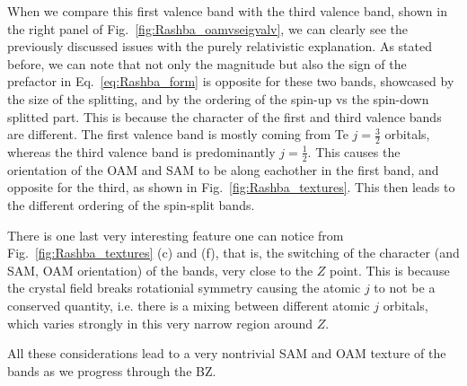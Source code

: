 When we compare this first valence band with the third valence band, shown in the right panel of Fig.~\ref{fig:Rashba_oamvseigvalv}, we can clearly see the previously discussed issues with the purely relativistic explanation. As stated before, we can note that not only the magnitude but also the sign of the prefactor in Eq.~\ref{eq:Rashba_form} is opposite for these two bands, showcased by the size of the splitting, and by the ordering of the spin-up vs the spin-down splitted part. This is because the character of the first and third valence bands are different. The first valence band is mostly coming from Te $j=\frac{3}{2}$ orbitals, whereas the third valence band is predominantly $j=\frac{1}{2}$. This causes the orientation of the OAM and SAM to be along eachother in the first band, and opposite for the third, as shown in Fig.~\ref{fig:Rashba_textures}. This then leads to the different ordering of the spin-split bands.

There is one last very interesting feature one can notice from Fig.~\ref{fig:Rashba_textures} (c) and (f), that is, the switching of the character (and SAM, OAM orientation) of the bands, very close to the $Z$ point. This is because the crystal field breaks rotationial symmetry causing the atomic $j$ to not be a conserved quantity, i.e. there is a mixing between different atomic $j$ orbitals, which varies strongly in this very narrow region around $Z$.

All these considerations lead to a very nontrivial SAM and OAM texture of the bands as we progress through the BZ.

\begin{figure*}[h]
\centering
{}
\caption{\label{fig:Rashba_oamvseigvalv}Comparison between the real-space observables and energy dispersion in (a) the first and (b) third valence band. The values are plotted in function of the relative distance from the $Z$ point $\bm{k}_r = \bm{k} - \bm{k}_Z$, towards the A and U points. The green graphs denote the values before turning on atomic SOC, whereas the orange and blue graphs denote the two spin-split bands.}
\end{figure*}

